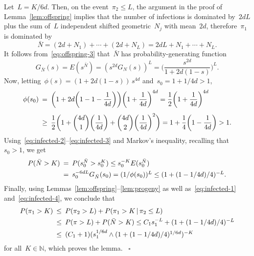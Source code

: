 \documentclass[letterpaper,11pt,twoside,keywordsasfootnote,addressatend,noinfoline]{article}
\newenvironment{proof}{\noindent{\bf Proof.}}{\hspace*{2mm}~$\square$}
\newcommand{\N}{\mathbb{N}}
\newcommand{\n}{\hspace*{-5pt}}
\begin{document}
\begin{proof}
 Let~$L = K / 6d$.
 Then, on the event~$\pi_2 \leq L$, the argument in the proof of Lemma~\ref{lem:offspring} implies that the number of infections is dominated by~$2dL$ plus the sum of~$L$ independent shifted geometric~$N_j$ with mean~$2d$, therefore~$\pi_1$ is dominated by
\begin{equation}
\label{eq:infected-1}
\bar N = (2d + N_1) + \cdots + (2d + N_L) = 2dL + N_1 + \cdots + N_L.
\end{equation}
 It follows from~\eqref{eq:offspring-3} that~$\bar N$ has probability-generating function
\begin{equation}
\label{eq:infected-2}
  G_{\bar N} (s) = E (s^{\bar N}) = (s^{2d} G_N (s))^L = \bigg(\frac{s^{2d}}{1 + 2d (1 - s)} \bigg)^L.
\end{equation}
 Now, letting~$\phi (s) = (1 + 2d (1 - s)) \,s^{4d}$ and~$s_0 = 1 + 1/4d > 1$,
\begin{equation}
\label{eq:infected-3}
\begin{array}{rcl}
\displaystyle \phi (s_0) & \n = \n &
\displaystyle \bigg(1 + 2d \bigg(1 - 1 - \frac{1}{4d} \bigg) \bigg) \bigg(1 + \frac{1}{4d} \bigg)^{4d} = \frac{1}{2} \bigg(1 + \frac{1}{4d} \bigg)^{4d} \vspace*{8pt} \\ & \n \geq \n &
\displaystyle \frac{1}{2} \bigg(1 + {4d \choose 1} \bigg(\frac{1}{4d} \bigg) + {4d \choose 2} \bigg(\frac{1}{4d} \bigg)^2 \bigg) = 1 + \frac{1}{4} \bigg(1 - \frac{1}{4d} \bigg) > 1. \end{array}
\end{equation}
 Using~\eqref{eq:infected-2}--\eqref{eq:infected-3} and Markov's inequality, recalling that~$s_0 > 1$, we get
\begin{equation}
\label{eq:infected-4}
\begin{array}{rcl}
  P (\bar N > K) & \n = \n &
  P (s_0^{\bar N} > s_0^K) \leq s_0^{-K} E (s_0^{\bar N}) \vspace*{4pt} \\ & \n = \n &
  s_0^{- 6dL} G_{\bar N} (s_0) = (1 / \phi (s_0))^L \leq (1 + (1 - 1/4d)/4)^{-L}. \end{array}
\end{equation}
 Finally, using Lemmas~\ref{lem:offspring}--\ref{lem:progeny} as well as~\eqref{eq:infected-1} and~\eqref{eq:infected-4}, we conclude that
 $$ \begin{array}{rcl}
      P (\pi_1 > K) & \n \leq \n &
      P (\pi_2 > L) + P (\pi_1 > K \,| \,\pi_2 \leq L) \vspace*{4pt} \\ & \n \leq \n &
      P (\pi > L) + P (\bar N > K) \leq
      C_1 s_1^{-L} + (1 + (1 - 1/4d)/4)^{-L}  \vspace*{4pt} \\ & \n \leq \n &
      (C_1 + 1)(s_1^{1 / 6d} \wedge (1 + (1 - 1/4d)/4)^{1 / 6d})^{-K} \end{array} $$
 for all~$K \in \N$, which proves the lemma.
\end{proof}
\end{document}
